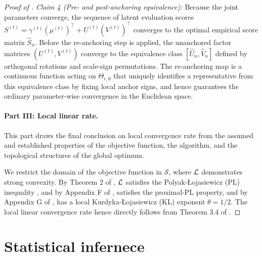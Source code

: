 \documentclass{article}
\begin{document}
\begin{bibunit}[unsrtnat]
\begin{proof}[Proof of ]
\textit{Claim 4 (Pre- and post-anchoring equivalence):}
Because the joint parameters converge, the sequence of latent evaluation scores $S^{(t)} = \gamma^{(t)}(\mu^{(t)})^\top + U^{(t)}(V^{(t)})^\top$ converges to the optimal empirical score matrix $\hat{S}_n$. Before the re-anchoring step is applied, the unanchored factor matrices $(U^{(t)}, V^{(t)})$ converge to the equivalence class $[\hat{U}_n, \hat{V}_n]$ defined by orthogonal rotations and scale-sign permutations. The re-anchoring map is a continuous function acting on $\Theta_{r,0}$ that uniquely identifies a representative from this equivalence class by fixing local anchor signs, and hence guarantees the ordinary parameter-wise convergence in the Euclidean space.

\paragraph{Part III: Local linear rate.} This part draws the final conclusion on local convergence rate from the assumed and established properties of the objective function, the algorithm, and the topological structures of the global optimum.

We restrict the domain of the objective function in $\mathcal{S}$, where $\mathcal{L}$ demonstrates strong convexity. By Theorem 2 of \cite{karimi2016linear}, $\mathcal{L}$ satisfies the Polyak-\L ojasiewicz (PL) inequality \citep{polyak1963gradient}, and by Appendix F of \cite{karimi2016linear}, satisfies the proximal-PL property, and by Appendix G of \cite{karimi2016linear}, has a local Kurdyka-\L ojasiewicz (KL) exponent $\theta=1/2$. The local linear convergence rate hence directly follows from Theorem 3.4 of \cite{attouch2010proximal}.
\end{proof}









\clearpage
\section{Statistical infernece}\label{app:stat}

\end{bibunit}
\end{document}
